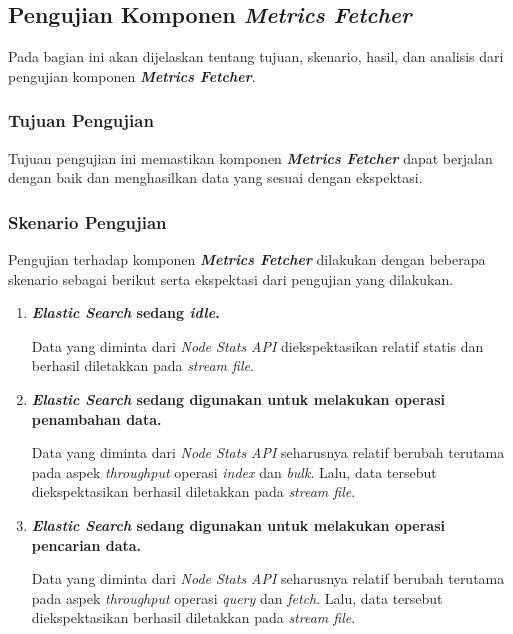 \subsection{Pengujian Komponen \textit{Metrics Fetcher}}

Pada bagian ini akan dijelaskan tentang tujuan, skenario, hasil, dan analisis dari pengujian komponen \textbf{\textit{Metrics Fetcher}}.

\subsubsection{Tujuan Pengujian}

Tujuan pengujian ini memastikan komponen \textbf{\textit{Metrics Fetcher}} dapat berjalan dengan baik dan menghasilkan data yang sesuai dengan ekspektasi.

\subsubsection{Skenario Pengujian}

Pengujian terhadap komponen \textbf{\textit{Metrics Fetcher}} dilakukan dengan beberapa skenario sebagai berikut serta ekspektasi dari pengujian yang dilakukan.
\begin{enumerate}
    \item \bfseries\textit{Elastic Search} sedang \textit{idle}.\normalfont
    
        Data yang diminta dari \textit{Node Stats API} diekspektasikan relatif statis dan berhasil diletakkan pada \textit{stream file}.
    \item \bfseries\textit{Elastic Search} sedang digunakan untuk melakukan operasi penambahan data.\normalfont
    
        Data yang diminta dari \textit{Node Stats API} seharusnya relatif berubah terutama pada aspek \textit{throughput} operasi \textit{index} dan \textit{bulk}. Lalu, data tersebut diekspektasikan berhasil diletakkan pada \textit{stream file}.

    \item \bfseries\textit{Elastic Search} sedang digunakan untuk melakukan operasi pencarian data.\normalfont
    
        Data yang diminta dari \textit{Node Stats API} seharusnya relatif berubah terutama pada aspek \textit{throughput} operasi \textit{query} dan \textit{fetch}. Lalu, data tersebut diekspektasikan berhasil diletakkan pada \textit{stream file}.
\end{enumerate}

